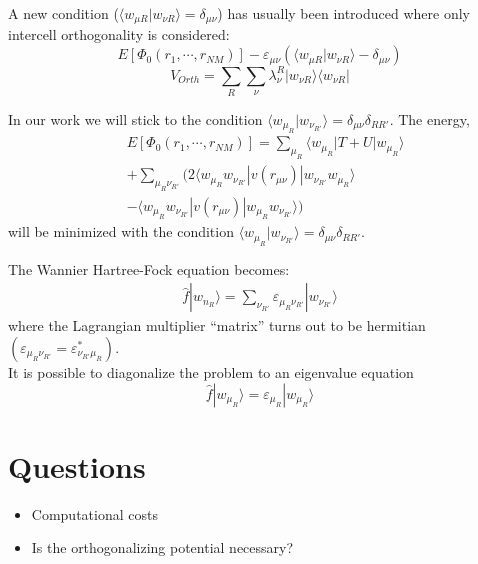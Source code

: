 \documentclass[12pt,a4paper,english]{beamer}
\newcommand{\bra}[1]{\langle #1|}
\newcommand{\ket}[1]{|#1\rangle}
\newcommand{\braket}[2]{\langle #1|#2\rangle}
\newcommand{\braopket}[3]{\langle #1|#2|#3\rangle}
\begin{document}
\begin{frame}
		A new condition ($\braket{w_{\mu R}}{w_{\nu {R}}}=\delta_{\mu\nu}$) has usually been introduced where only intercell orthogonality
  is considered:
  \begin{equation*}
		  E[\Phi_0(r_{1},\cdots,r_{NM})]-\varepsilon_{\mu \nu}(\braket{w_{\mu R}}{w_{\nu {R}}}-\delta_{\mu\nu})
  \end{equation*}
  \begin{equation*}
		  V_{Orth}=\sum_{R}\sum_{\nu}\lambda^R_\nu
		  \ket{w_{\nu R}}\bra{w_{\nu R}}
  \end{equation*}
\end{frame}

\begin{frame}
		In our work we will stick to the condition $\braket{w_{\mu_R}}{w_{\nu_{R'}}}=\delta_{\mu\nu}\delta_{R R'}.$ The energy,
  \begin{equation*}
	\begin{split}
	  &E[\Phi_0(r_{1},\cdots,r_{NM})]=
	  \sum_{\mu_R} \braopket{w_{\mu_R}}{T+U}{w_{\mu_R}}\\
	  &+\sum_{\mu_R\nu_{R'}}\Big(2\braopket{w_{\mu_R}w_{\nu_{R'}}}{v(r_{\mu\nu})}{w_{\nu_{R'}}w_{\mu_R}}\\
	  &-\braopket{w_{\mu_R}w_{\nu_{R'}}}{v(r_{\mu\nu})}{w_{\mu_R}w_{\nu_{R'}}}\Big)
	\end{split}
  \end{equation*}
  will be minimized with the condition $\braket{w_{\mu_R}}{w_{\nu_{R'}}}=\delta_{\mu\nu}\delta_{R R'}.$
\end{frame}

\begin{frame}
  The Wannier Hartree-Fock equation becomes:
  \begin{equation*}
	\begin{split}
			\hat{f}\ket{w_{n_R}}=\sum_{\nu_{R'}}\varepsilon_{\mu_R\nu_{R'}}\ket{w_{\nu_{R'}}}
	\end{split}
  \end{equation*}
  where the Lagrangian multiplier ``matrix'' turns out to be hermitian $(\varepsilon_{\mu_R\nu_{R'}}=\varepsilon^*_{\nu_{R'}\mu_R})$.\\ It is possible to diagonalize the problem to an eigenvalue equation
  \begin{equation}
	\hat{f}\ket{w_{\mu_R}}=\varepsilon_{\mu_R}\ket{w_{\mu_R}}
  \end{equation}
\end{frame}

\section{Questions}
\begin{frame}
  \begin{itemize}
	\item Computational costs
	\item Is the orthogonalizing potential necessary?
  \end{itemize}
\end{frame}
\end{document}
